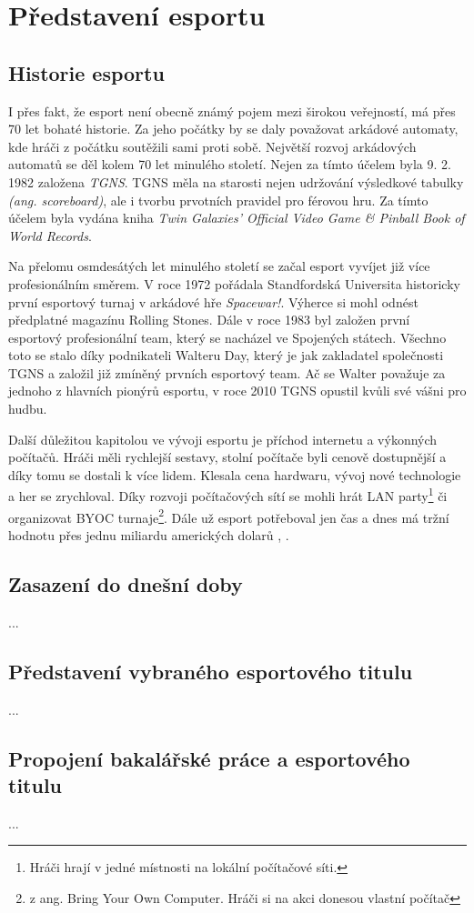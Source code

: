 \chapter{Představení esportu}
\section{Historie esportu}
I přes fakt, že esport není obecně známý pojem mezi širokou veřejností, má přes 70 let bohaté historie. Za jeho počátky by se
daly považovat arkádové automaty, kde hráči z počátku soutěžili sami proti sobě. Největší rozvoj arkádových automatů se děl kolem 70 let minulého 
století. Nejen za tímto účelem byla 9. 2. 1982 založena \textit{\ac{TGNS}}. \ac{TGNS} měla na starosti nejen udržování výsledkové tabulky \textit{(ang. scoreboard)},
ale i tvorbu prvotních pravidel pro férovou hru. Za tímto účelem byla vydána kniha \textit{Twin Galaxies' Official Video Game \& Pinball Book of World Records}.

Na přelomu osmdesátých let minulého století se začal esport vyvíjet již více profesionálním směrem. V roce 1972 pořádala Standfordská Universita historicky první
esportový turnaj v arkádové hře \textit{Spacewar!}. Výherce si mohl odnést předplatné magazínu Rolling Stones. Dále v roce 1983 byl založen první esportový profesionální team,
který se nacházel ve Spojených státech. Všechno toto se stalo díky podnikateli Walteru Day, který je jak zakladatel společnosti \ac{TGNS} a založil již zmíněný
prvních esportový team. Ač se Walter považuje za jednoho z hlavních pionýrů esportu, v roce 2010 \ac{TGNS} opustil kvůli své vášni pro hudbu.

Další důležitou kapitolou ve vývoji esportu je příchod internetu a výkonných počítačů. Hráči měli rychlejší sestavy, stolní počítače byli cenově dostupnější a díky tomu
se dostali k více lidem. Klesala cena hardwaru, vývoj nové technologie a her se zrychloval. Díky rozvoji počítačových sítí se mohli hrát LAN party\footnote{Hráči hrají v jedné
místnosti na lokální počítačové síti.} či organizovat BYOC turnaje\footnote{z ang. Bring Your Own Computer. Hráči si na akci donesou vlastní počítač}. Dále už esport potřeboval
jen čas a dnes má tržní hodnotu přes jednu miliardu amerických dolarů \cite{Gough2021}, \cite{Larch2019}.
\section{Zasazení do dnešní doby}
...

\section{Představení vybraného esportového titulu}
...

\section{Propojení bakalářské práce a esportového titulu}
...

